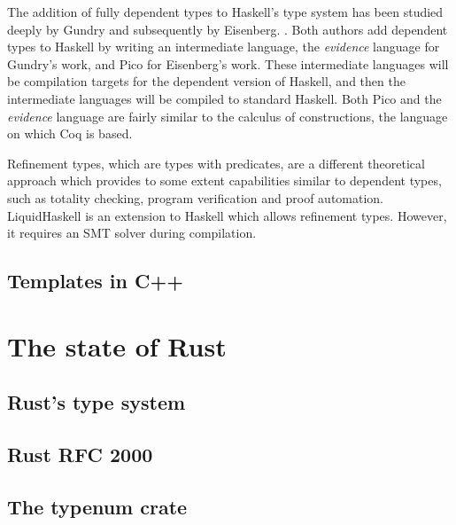 The addition of fully dependent types to Haskell's type
system has been studied deeply by Gundry \cite{gundry} and subsequently by
Eisenberg. \cite{eisenberg}. Both authors add dependent types to Haskell by
writing an intermediate language, the \textit{evidence} language for Gundry's
work, and Pico for Eisenberg's work. These intermediate languages will be
compilation targets for the dependent version of Haskell, and then the
intermediate languages will be compiled to standard Haskell. Both Pico and the
\textit{evidence} language are fairly similar to the calculus of constructions,
the language on which Coq is based.

Refinement types, which are types with predicates,
are a different theoretical approach which provides to some extent capabilities
similar to dependent types, such as totality checking, program verification and
proof automation. LiquidHaskell is an extension to Haskell which allows
refinement types. However, it requires an SMT solver during compilation.
\cite{liquidhaskell} 

\subsection{Templates in C++}

\section{The state of Rust} \subsection{Rust's type system} \subsection{Rust RFC
2000} \subsection{The typenum crate}
